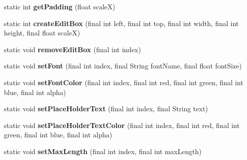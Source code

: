 \begin{DoxyCompactItemize}
static int {\bfseries get\+Padding} (float scaleX)
\item 
\mbox{\label{classorg_1_1cocos2dx_1_1lib_1_1Cocos2dxEditBoxHelper_a649309f38c0470ba193fb965cf4df12c}} 
static int {\bfseries create\+Edit\+Box} (final int left, final int top, final int width, final int height, final float scaleX)
\item 
\mbox{\label{classorg_1_1cocos2dx_1_1lib_1_1Cocos2dxEditBoxHelper_af15fe7a70c16b0c45715b4926fdcc586}} 
static void {\bfseries remove\+Edit\+Box} (final int index)
\item 
\mbox{\label{classorg_1_1cocos2dx_1_1lib_1_1Cocos2dxEditBoxHelper_ac91997ad80ca9bbda19fd11b6c2c4add}} 
static void {\bfseries set\+Font} (final int index, final String font\+Name, final float font\+Size)
\item 
\mbox{\label{classorg_1_1cocos2dx_1_1lib_1_1Cocos2dxEditBoxHelper_a54f094d165cadb985dae4279a12d85ee}} 
static void {\bfseries set\+Font\+Color} (final int index, final int red, final int green, final int blue, final int alpha)
\item 
\mbox{\label{classorg_1_1cocos2dx_1_1lib_1_1Cocos2dxEditBoxHelper_ac65184cb564186b748253db5e37b913d}} 
static void {\bfseries set\+Place\+Holder\+Text} (final int index, final String text)
\item 
\mbox{\label{classorg_1_1cocos2dx_1_1lib_1_1Cocos2dxEditBoxHelper_a4549c434143b42ced9989141d81e8531}} 
static void {\bfseries set\+Place\+Holder\+Text\+Color} (final int index, final int red, final int green, final int blue, final int alpha)
\item 
\mbox{\label{classorg_1_1cocos2dx_1_1lib_1_1Cocos2dxEditBoxHelper_a4c7a16d4be910e4d10e5797f42788924}} 
static void {\bfseries set\+Max\+Length} (final int index, final int max\+Length)
\item 
\mbox{\label{classorg_1_1cocos2dx_1_1lib_1_1Cocos2dxEditBoxHelper_a475bf838ea1873c7a6dc071fb6311898}} 

\end{DoxyCompactItemize}
